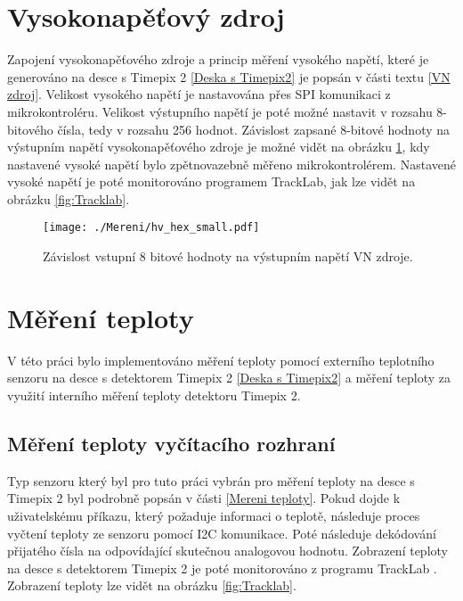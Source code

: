 \section{Vysokonapěťový zdroj}
Zapojení vysokonapěťového zdroje a princip měření vysokého napětí, které je generováno na desce s Timepix 2 \ref{Deska s Timepix2} je popsán v části textu \ref{VN zdroj}. Velikost vysokého napětí je nastavována přes SPI komunikaci z mikrokontroléru. Velikost výstupního napětí je poté možné nastavit v rozsahu 8-bitového čísla, tedy v rozsahu 256 hodnot. Závislost zapsané 8-bitové hodnoty na výstupním napětí vysokonapěťového zdroje je možné vidět na obrázku \ref{fig:hv_hex}, kdy nastavené vysoké napětí bylo zpětnovazebně měřeno mikrokontrolérem. Nastavené vysoké napětí je poté monitorováno programem TrackLab, jak lze vidět na obrázku \ref{fig:Tracklab}.
\begin{figure}[h!]
	\centering
	\captionsetup{justification=centering}
	\texttt{[image: ./Mereni/hv\_hex\_small.pdf]}
	\caption{Závislost vstupní 8 bitové hodnoty na výstupním napětí VN zdroje.} 
	\label{fig:hv_hex}
\end{figure}



\section{Měření teploty}
V této práci bylo implementováno měření teploty pomocí externího teplotního senzoru na desce s detektorem Timepix 2 \ref{Deska s Timepix2} a měření teploty za využití interního měření teploty detektoru Timepix 2.
\subsection{Měření teploty vyčítacího rozhraní}
Typ senzoru který byl pro tuto práci vybrán pro měření teploty na desce s Timepix 2 byl podrobně popsán v části \ref{Mereni teploty}. Pokud dojde k uživatelskému příkazu, který požaduje informaci o teplotě, následuje proces vyčtení teploty ze senzoru pomocí I2C komunikace. Poté následuje dekódování přijatého čísla na odpovídající skutečnou analogovou hodnotu. Zobrazení teploty na desce s detektorem Timepix 2 je poté monitorováno z programu TrackLab \cite{Manek_2024}. Zobrazení teploty lze vidět na obrázku \ref{fig:Tracklab}.
